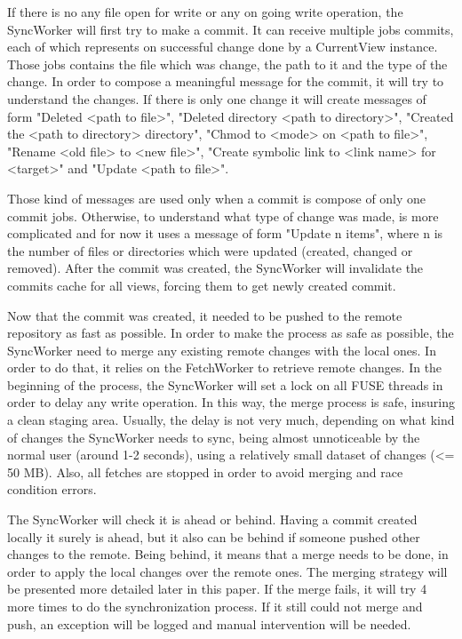 If there is no any file open for write or any on going write operation, the SyncWorker will first try to make a commit. It can receive multiple jobs commits, each of which represents on successful change done by a CurrentView instance. Those jobs contains the file which was change, the path to it and the type of the change. In order to compose a meaningful message for the commit, it will try to understand the changes. If there is only one change it will create messages of form "Deleted <path to file>", "Deleted directory <path to directory>", "Created the <path to directory> directory", "Chmod to <mode> on <path to file>", "Rename <old file> to <new file>", "Create symbolic link to <link name> for <target>" and "Update <path to file>".

Those kind of messages are used only when a commit is compose of only one commit jobs. Otherwise, to understand what type of change was made, is more complicated and for now it uses a message of form "Update n items", where n is the number of files or directories which were updated (created, changed or removed).
After the commit was created, the SyncWorker will invalidate the commits cache for all views, forcing them to get newly created commit. 

Now that the commit was created, it needed to be pushed to the remote repository as fast as possible. In order to make the process as safe as possible, the SyncWorker need to merge any existing remote changes with the local ones. In order to do that, it relies on the FetchWorker to retrieve remote changes. In the beginning of the process, the SyncWorker will set a lock on all FUSE threads in order to delay any write operation. In this way, the merge process is safe, insuring a clean staging area. Usually, the delay is not very much, depending on what kind of changes the SyncWorker needs to sync, being almost unnoticeable by the normal user (around 1-2 seconds), using a relatively small dataset of changes (<= 50 MB). Also, all fetches are stopped in order to avoid merging and race condition errors.

The SyncWorker will check it is ahead or behind. Having a commit created locally it surely is ahead, but it also can be behind if someone pushed other changes to the remote. Being behind, it means that a merge needs to be done, in order to apply the local changes over the remote ones. The merging strategy will be presented more detailed later in this paper. If the merge fails, it will try 4 more times to do the synchronization process. If it still could not merge and push, an exception will be logged and manual intervention will be needed.

